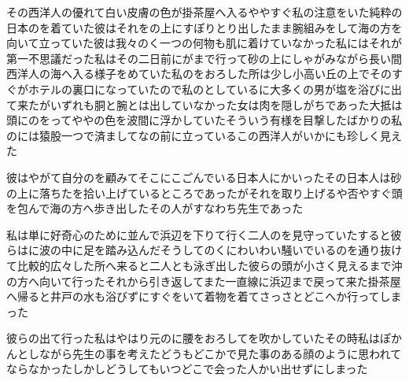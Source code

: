 \documentclass[a4j,twocolumn]{tarticle}
\begin{document}
その西洋人の優れて白い皮膚の色が\、掛茶屋へ入るやや\、すぐ私の注意をいた\。純粋の日本のを着ていた彼は\、それをの上にすぽりとり出したまま\、腕組みをして海の方を向いて立っていた\。彼は我々のく一つの何物も肌に着けていなかった\。私にはそれが第一不思議だった\。私はその二日前にがまで行って\、砂の上にしゃがみながら\、長い間西洋人の海へ入る様子をめていた\。私のをおろした所は少し小高い丘の上で\、そのすぐがホテルの裏口になっていたので\、私のとしているに\、大多くの男が塩を浴びに出て来たが\、いずれも胴と腕とは出していなかった\。女は肉を隠しがちであった\。大抵は頭にのをって\、ややの色を波間に浮かしていた\。そういう有様を目撃したばかりの私のには\、猿股一つで済ましてなの前に立っているこの西洋人がいかにも珍しく見えた\。

彼はやがて自分のを顧みて\、そこにこごんでいる日本人に\、かいった\。その日本人は砂の上に落ちたを拾い上げているところであったが\、それを取り上げるや否や\、すぐ頭を包んで\、海の方へ歩き出した\。その人がすなわち先生であった\。

私は単に好奇心のために\、並んで浜辺を下りて行く二人のを見守っていた\。すると彼らはに波の中に足を踏み込んだ\。そうしてのくにわいわい騒いでいるのを通り抜けて\、比較的広々した所へ来ると\、二人とも泳ぎ出した\。彼らの頭が小さく見えるまで沖の方へ向いて行った\。それから引き返してまた一直線に浜辺まで戻って来た\。掛茶屋へ帰ると\、井戸の水も浴びずに\、すぐをいて着物を着て\、さっさとどこへか行ってしまった\。

彼らの出て行った\、私はやはり元のに腰をおろしてを吹かしていた\。その時私はぽかんとしながら先生の事を考えた\。どうもどこかで見た事のある顔のように思われてならなかった\。しかしどうしてもいつどこで会った人かい出せずにしまった\。
\end{document}
